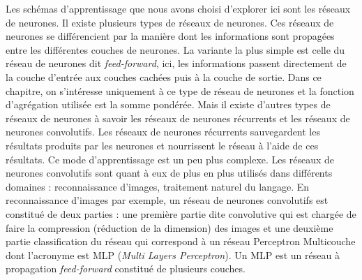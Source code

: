 Les schémas d'apprentissage que nous avons choisi d'explorer ici sont les réseaux de neurones.
Il existe plusieurs types de réseaux de neurones. Ces réseaux de neurones se différencient par la manière dont les informations sont propagées entre les différentes couches de neurones. La variante la plus simple est celle du réseau de neurones dit  \textit{ feed-forward}, ici, les informations passent directement de la couche d'entrée aux couches cachées puis à la couche de sortie. Dans ce chapitre, on s'intéresse uniquement  à ce type de réseau de neurones et la fonction d'agrégation utilisée est la somme pondérée. Mais il existe d'autres types de réseaux de neurones à savoir les réseaux de neurones récurrents et les réseaux de neurones convolutifs. Les réseaux de neurones récurrents sauvegardent les résultats produits par les neurones et nourrissent le réseau à l'aide de ces résultats. Ce mode d'apprentissage est un peu plus complexe.
Les réseaux de neurones convolutifs sont quant à eux de plus en plus utilisés dans différents domaines : reconnaissance d'images, traitement naturel du langage. En reconnaissance d'images par exemple, un réseau de neurones convolutifs est constitué de deux parties : une première partie dite convolutive qui est chargée de faire la compression (réduction de la dimension) des images et une deuxième partie classification du réseau qui correspond à un réseau Perceptron Multicouche dont l'acronyme est MLP (\textit{Multi Layers Perceptron}). Un MLP est un réseau à propagation \textit{ feed-forward} constitué de plusieurs couches. 

